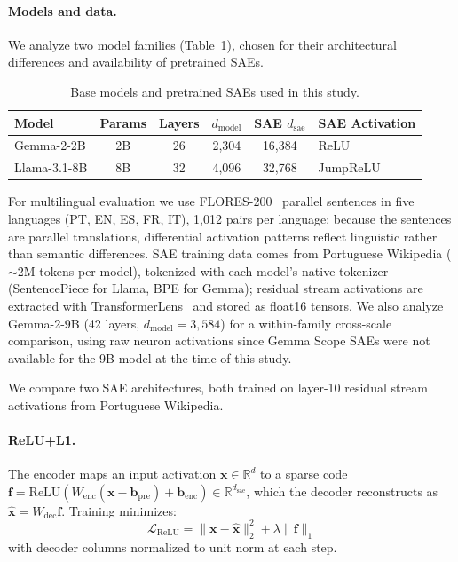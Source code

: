 \documentclass[runningheads]{llncs}
\begin{document}
\paragraph{Models and data.}
We analyze two model families (Table~\ref{tab:models}), chosen for their architectural differences and availability of pretrained SAEs.

\begin{table}[t]
\centering
\caption{Base models and pretrained SAEs used in this study.}
\label{tab:models}
\begin{tabular}{lccccl}
\toprule
\textbf{Model} & \textbf{Params} & \textbf{Layers} & $d_\text{model}$ & \textbf{SAE $d_\text{sae}$} & \textbf{SAE Activation} \\
\midrule
Gemma-2-2B & 2B & 26 & 2,304 & 16,384 & ReLU \\
Llama-3.1-8B & 8B & 32 & 4,096 & 32,768 & JumpReLU \\
\bottomrule
\end{tabular}
\end{table}

For multilingual evaluation we use FLORES-200~\cite{costa2022no} parallel sentences in five languages (PT, EN, ES, FR, IT), 1,012 pairs per language; because the sentences are parallel translations, differential activation patterns reflect linguistic rather than semantic differences. SAE training data comes from Portuguese Wikipedia ($\sim$2M tokens per model), tokenized with each model's native tokenizer (SentencePiece for Llama, BPE for Gemma); residual stream activations are extracted with TransformerLens~\cite{nanda2022transformerlens} and stored as float16 tensors. We also analyze Gemma-2-9B (42 layers, $d_\text{model}{=}3{,}584$) for a within-family cross-scale comparison, using raw neuron activations since Gemma Scope SAEs were not available for the 9B model at the time of this study.

We compare two SAE architectures, both trained on layer-10 residual stream activations from Portuguese Wikipedia.

\paragraph{ReLU+L1.} The encoder maps an input activation $\mathbf{x} \in \mathbb{R}^{d}$ to a sparse code $\mathbf{f} = \text{ReLU}(W_\text{enc}(\mathbf{x} - \mathbf{b}_\text{pre}) + \mathbf{b}_\text{enc}) \in \mathbb{R}^{d_\text{sae}}$, which the decoder reconstructs as $\hat{\mathbf{x}} = W_\text{dec}\mathbf{f}$. Training minimizes:
\begin{equation}
\mathcal{L}_{\text{ReLU}} = \|\mathbf{x} - \hat{\mathbf{x}}\|_2^2 + \lambda \|\mathbf{f}\|_1
\label{eq:relu_loss}
\end{equation}
with decoder columns normalized to unit norm at each step.
\end{document}
